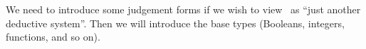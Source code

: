 \begin{node}\label{sml-0003}%
We need to introduce some judgement forms if we wish to view \SML\ as
``just another deductive system''. Then we will introduce the base types
(Booleans, integers, functions, and so on).
\end{node}
